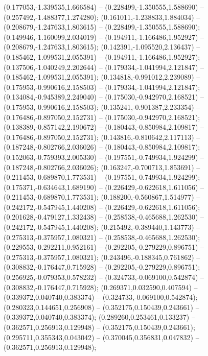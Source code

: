  (0.177053,-1.339535,1.666584) -- (0.228499,-1.350555,1.588690) -- (0.257492,-1.488377,1.274280);
 (0.161011,-1.238833,1.884034) -- (0.208679,-1.247633,1.803615) -- (0.228499,-1.350555,1.588690);
 (0.149946,-1.160099,2.034019) -- (0.194911,-1.166486,1.952927) -- (0.208679,-1.247633,1.803615);
 (0.142391,-1.095520,2.136437) -- (0.185462,-1.099531,2.055391) -- (0.194911,-1.166486,1.952927);
 (0.137506,-1.040249,2.202644) -- (0.179334,-1.041994,2.121847) -- (0.185462,-1.099531,2.055391);
 (0.134818,-0.991012,2.239089) -- (0.175953,-0.990616,2.158503) -- (0.179334,-1.041994,2.121847);
 (0.134084,-0.945389,2.249040) -- (0.175030,-0.942970,2.168521) -- (0.175953,-0.990616,2.158503);
 (0.135241,-0.901387,2.233354) -- (0.176486,-0.897050,2.152731) -- (0.175030,-0.942970,2.168521);
 (0.138389,-0.857142,2.190672) -- (0.180443,-0.850984,2.109817) -- (0.176486,-0.897050,2.152731);
 (0.143816,-0.810642,2.117113) -- (0.187248,-0.802766,2.036026) -- (0.180443,-0.850984,2.109817);
 (0.152063,-0.759393,2.005330) -- (0.197551,-0.749934,1.924299) -- (0.187248,-0.802766,2.036026);
 (0.163247,-0.700713,1.853691) -- (0.211453,-0.689870,1.773531) -- (0.197551,-0.749934,1.924299);
 (0.175371,-0.634643,1.689190) -- (0.226429,-0.622618,1.611056) -- (0.211453,-0.689870,1.773531);
 (0.188200,-0.560867,1.514977) -- (0.242172,-0.547945,1.440208) -- (0.226429,-0.622618,1.611056);
 (0.201628,-0.479127,1.332438) -- (0.258538,-0.465688,1.262530) -- (0.242172,-0.547945,1.440208);
 (0.215492,-0.389440,1.143773) -- (0.275313,-0.375957,1.080321) -- (0.258538,-0.465688,1.262530);
 (0.229553,-0.292211,0.952161) -- (0.292205,-0.279229,0.896751) -- (0.275313,-0.375957,1.080321);
 (0.243496,-0.188345,0.761862) -- (0.308832,-0.176447,0.715928) -- (0.292205,-0.279229,0.896751);
 (0.256925,-0.079353,0.578232) -- (0.324733,-0.069100,0.542874) -- (0.308832,-0.176447,0.715928);
 (0.269371,0.032590,0.407594) -- (0.339372,0.040740,0.383374) -- (0.324733,-0.069100,0.542874);
 (0.280323,0.144651,0.256908) -- (0.352175,0.150439,0.243661) -- (0.339372,0.040740,0.383374);
 (0.289260,0.253461,0.133237) -- (0.362571,0.256913,0.129948) -- (0.352175,0.150439,0.243661);
 (0.295711,0.355343,0.043042) -- (0.370045,0.356831,0.047832) -- (0.362571,0.256913,0.129948);
